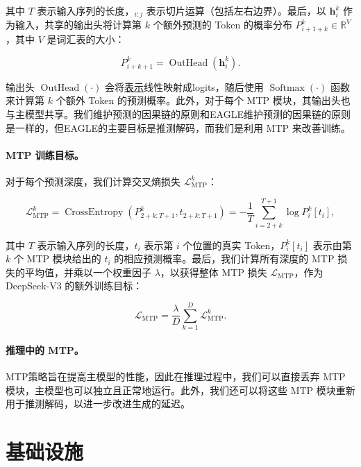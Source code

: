 \documentclass[lang=cn,a4paper,newtx]{elegantpaper}
\newcommand{\dsviii}{DeepSeek-V3}
\begin{document}
其中 $T$ 表示输入序列的长度，$_{i:j}$ 表示切片运算（包括左右边界）。最后，以 $\mathbf{h}_{i}^{k}$ 作为输入，共享的输出头将计算第 $k$ 个额外预测的 Token 的概率分布 $P_{i+1+k}^{k} \in \mathbb{R}^{V}$，其中 $V$ 是词汇表的大小：

\begin{equation}
    P_{i+k+1}^{k} = \operatorname{OutHead}(\mathbf{h}_{i}^{k}).
\end{equation}

输出头 $\operatorname{OutHead}(\cdot)$ 会将\underline{表示}线性映射成logits，随后使用 $\operatorname{Softmax}(\cdot)$ 函数来计算第 $k$ 个额外 Token 的预测概率。此外，对于每个 MTP 模块，其输出头也与主模型共享。我们维护预测的因果链的原则和EAGLE维护预测的因果链的原则是一样的，但EAGLE的主要目标是推测解码，而我们是利用 MTP 来改善训练。

\paragraph{MTP 训练目标。}
对于每个预测深度，我们计算交叉熵损失 $\mathcal{L}_{\text{MTP}}^{k}$：

\begin{equation}
    \mathcal{L}_{\text{MTP}}^{k} = \operatorname{CrossEntropy}(P_{2 + k:T + 1}^{k}, t_{2 + k:T + 1}) = -\frac{1}{T} \sum_{i=2 + k}^{T + 1} \log P_i^k [t_i],
\end{equation}

其中 $T$ 表示输入序列的长度，$t_i$ 表示第 $i$ 个位置的真实 Token，$P_i^k [t_i]$ 表示由第 $k$ 个 MTP 模块给出的 $t_i$ 的相应预测概率。最后，我们计算所有深度的 MTP 损失的平均值，并乘以一个权重因子 $\lambda$，以获得整体 MTP 损失 $\mathcal{L}_{\text{MTP}}$，作为 \dsviii{} 的额外训练目标：

\begin{equation}
    \mathcal{L}_{\text{MTP}} = \frac{\lambda}{D} \sum_{k=1}^{D} \mathcal{L}_{\text{MTP}}^{k}.
\end{equation}

\paragraph{推理中的 MTP。}
MTP策略旨在提高主模型的性能，因此在推理过程中，我们可以直接丢弃 MTP 模块，主模型也可以独立且正常地运行。此外，我们还可以将这些 MTP 模块重新用于推测解码，以进一步改进生成的延迟。

\section{基础设施}
\label{sec:infra}
\end{document}
